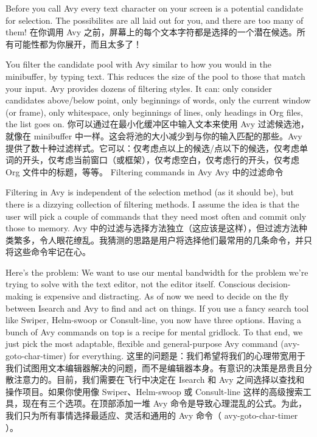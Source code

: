 \documentclass[lang=cn,color=blue]{elegantbook}
\begin{document}
Before you call Avy every text character on your screen is a potential candidate for selection. The possibilites are all laid out for you, and there are too many of them!
在你调用 Avy 之前，屏幕上的每个文本字符都是选择的一个潜在候选。所有可能性都为你展开，而且太多了！

You filter the candidate pool with Avy similar to how you would in the minibuffer, by typing text. This reduces the size of the pool to those that match your input. Avy provides dozens of filtering styles. It can: only consider candidates above/below point, only beginnings of words, only the current window (or frame), only whitespace, only beginnings of lines, only headings in Org files, the list goes on.
你可以通过在最小化缓冲区中输入文本来使用 Avy 过滤候选池，就像在 minibuffer 中一样。这会将池的大小减少到与你的输入匹配的那些。Avy 提供了数十种过滤样式。它可以：仅考虑点以上的候选/点以下的候选，仅考虑单词的开头，仅考虑当前窗口（或框架），仅考虑空白，仅考虑行的开头，仅考虑 Org 文件中的标题，等等。
Filtering commands in Avy
Avy 中的过滤命令















Filtering in Avy is independent of the selection method (as it should be), but there is a dizzying collection of filtering methods. I assume the idea is that the user will pick a couple of commands that they need most often and commit only those to memory.
Avy 中的过滤与选择方法独立（这应该是这样），但过滤方法种类繁多，令人眼花缭乱。我猜测的思路是用户将选择他们最常用的几条命令，并只将这些命令牢记在心。

Here’s the problem: We want to use our mental bandwidth for the problem we’re trying to solve with the text editor, not the editor itself. Conscious decision-making is expensive and distracting. As of now we need to decide on the fly between Isearch and Avy to find and act on things. If you use a fancy search tool like Swiper, Helm-swoop or Consult-line, you now have three options. Having a bunch of Avy commands on top is a recipe for mental gridlock. To that end, we just pick the most adaptable, flexible and general-purpose Avy command (avy-goto-char-timer) for everything.
这里的问题是：我们希望将我们的心理带宽用于我们试图用文本编辑器解决的问题，而不是编辑器本身。有意识的决策是昂贵且分散注意力的。目前，我们需要在飞行中决定在 Isearch 和 Avy 之间选择以查找和操作项目。如果你使用像 Swiper、Helm-swoop 或 Consult-line 这样的高级搜索工具，现在有三个选项。在顶部添加一堆 Avy 命令是导致心理混乱的公式。为此，我们只为所有事情选择最适应、灵活和通用的 Avy 命令（ avy-goto-char-timer ）。
\end{document}
